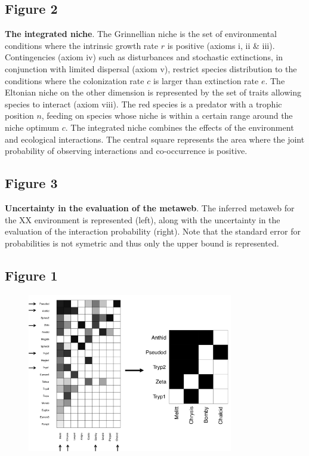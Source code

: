 \documentclass[12pt]{article}
\begin{document}
\subsection*{Figure 2}
\textbf{The integrated niche}.  The Grinnellian niche is the set of environmental conditions
where the intrinsic growth rate $r$ is positive (axioms i, ii \& iii).
Contingencies (axiom iv) such as disturbances and stochastic extinctions, in
conjunction with limited dispersal (axiom v), restrict species distribution to
the conditions where the colonization rate $c$ is larger than extinction rate
$e$. The Eltonian niche on the other dimension is represented by the set of
traits allowing species to interact (axiom viii). The red species is a predator
with a trophic position $n$, feeding on species whose niche is within a certain
range around the niche optimum $c$. The integrated niche combines the effects of
the environment and ecological interactions. The central square represents the
area where the joint probability of observing interactions and co-occurrence is
positive.

\subsection*{Figure 3}
\textbf{Uncertainty in the evaluation of the metaweb}. The inferred metaweb for the XX environment is represented (left), along with the uncertainty in the evaluation of the interaction probability (right). Note that the standard error for probabilities is not symetric and thus only the upper bound is represented. 

\newpage
\subsection*{Figure 1}

\begin{figure}[ht!]
	\centering\includegraphics[width=0.8\textwidth]{sampling}
\end{figure}
\end{document}
